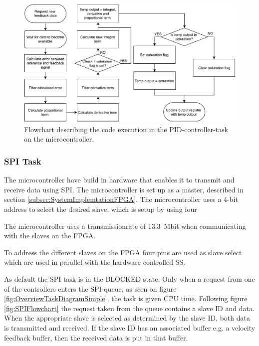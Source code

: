 \documentclass[../../main.tex]{subfiles}
\begin{document}
\begin{figure}[H]
    \centering
    \includegraphics[width=\textwidth]{Sections/System_Implementation/Images/PIDControllerFlowchart.pdf}
    \caption{Flowchart describing the code execution in the PID-controller-task on the microcontroller.}
    \label{fig:PIDControllerFlowchart}
\end{figure}





\subsubsection*{SPI Task}
The microcontroller have build in hardware that enables it to transmit and receive data using SPI. The microcontroller is set up as a master, described in section \ref{subsec:SystemImplemtationFPGA}. The microcontroller uses a 4-bit address to select the desired slave, which is setup by using four 


The microcontroller uses a transmissionrate of \SI{13.3}{\mega bit} when communicating with the slaves on the FPGA. 

To address the different slaves on the FPGA four pins are used as slave select which are used in parallel with the hardware controlled SS.

As default the SPI task is in the BLOCKED state. Only when a request from one of the controllers enters the SPI-queue, as seen on figure \ref{fig:OverviewTaskDiagramSimple}, the task is given CPU time. Following figure \ref{fig:SPIFlowchart} the request taken from the queue contains a slave ID and data. When the appropriate slave is selected as determined by the slave ID, both data is transmitted and received. If the slave ID has an associated buffer e.g. a velocity feedback buffer, then the received data is put in that buffer.  
\end{document}
